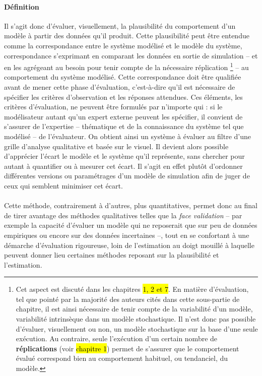 \paragraph{Définition} Il s'agit donc d'évaluer, visuellement, la plausibilité du comportement d'un modèle à partir des données qu'il produit.
Cette plausibilité peut être entendue comme la correspondance entre le système modélisé et le modèle du système, correspondance s'exprimant en comparant les données en sortie de simulation -- et en les agrégeant au besoin pour tenir compte de la nécessaire réplication
\footnote{
	Cet aspect est discuté dans les chapitres \hl{1, 2 et 7}.
	En matière d'évaluation, tel que pointé par la majorité des auteurs cités dans cette sous-partie de chapitre, il est ainsi nécessaire de tenir compte de la variabilité d'un modèle, variabilité intrinsèque dans un modèle stochastique.
	Il n'est donc pas possible d'évaluer, visuellement ou non, un modèle stochastique sur la base d'une seule exécution. Au contraire, seule l'exécution d'un certain nombre de \textbf{réplications} (voir \hl{chapitre 1}) permet de s'assurer que le comportement évalué correspond bien au comportement habituel, ou tendanciel, du modèle.
} -- au comportement du système modélisé.
Cette correspondance doit être qualifiée avant de mener cette phase d'évaluation, c'est-à-dire qu'il est nécessaire de spécifier les critères d'observation et les réponses attendues.
Ces éléments, les critères d'évaluation, ne peuvent être formulés par n'importe qui : si le modélisateur autant qu'un expert externe peuvent les spécifier, il convient de s'assurer de l'expertise -- thématique et de la connaissance du système tel que modélisé -- de l'évaluateur.
On obtient ainsi un système à évaluer au filtre d'une grille d'analyse qualitative et basée sur le visuel.
Il devient alors possible d'apprécier l'écart le modèle et le système qu'il représente, sans chercher pour autant à quantifier ou à mesurer cet écart. 
Il s'agit en effet plutôt d'ordonner différentes versions ou paramétrages d'un modèle de simulation afin de juger de ceux qui semblent minimiser cet écart.

\paragraph*{}Cette méthode, contrairement à d'autres, plus quantitatives, permet donc au final de tirer avantage des méthodes qualitatives telles que la \textit{face validation} -- par exemple la capacité d'évaluer un modèle qui ne reposerait que sur peu de données empiriques ou encore sur des données incertaines --, tout en se confortant à une démarche d'évaluation rigoureuse, loin de l'estimation \og au doigt mouillé\fg{} à laquelle peuvent donner lieu certaines méthodes reposant sur la plausibilité et l'estimation.

